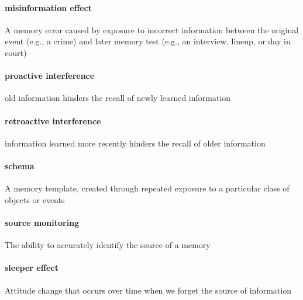 \documentclass[
]{krantz}
\begin{document}
\paragraph*{misinformation effect}\label{misinformation-effect-1}

A memory error caused by exposure to incorrect information between the original event (e.g., a crime) and later memory test (e.g., an interview, lineup, or day in court)

\paragraph*{proactive interference}\label{proactive-interference}

old information hinders the recall of newly learned information

\paragraph*{retroactive interference}\label{retroactive-interference}

information learned more recently hinders the recall of older information

\paragraph*{schema}\label{schema}

A memory template, created through repeated exposure to a particular class of objects or events

\paragraph*{source monitoring}\label{source-monitoring-1}

The ability to accurately identify the source of a memory

\paragraph*{sleeper effect}\label{sleeper-effect}

Attitude change that occurs over time when we forget the source of information
\end{document}
